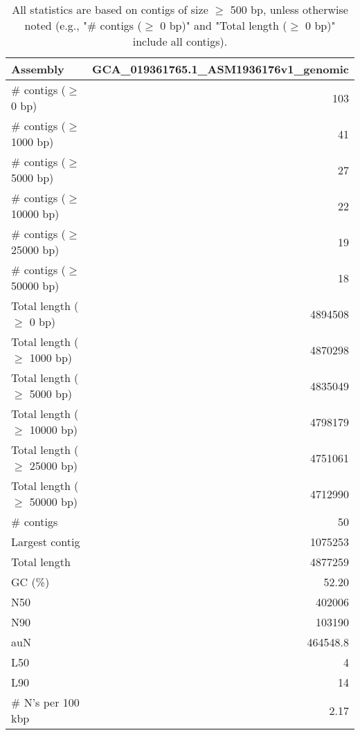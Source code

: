\documentclass[12pt,a4paper]{article}
\begin{document}
\begin{table}[ht]
\begin{center}
\caption{All statistics are based on contigs of size $\geq$ 500 bp, unless otherwise noted (e.g., "\# contigs ($\geq$ 0 bp)" and "Total length ($\geq$ 0 bp)" include all contigs).}
\begin{tabular}{|l*{1}{|r}|}
\hline
Assembly & GCA\_019361765.1\_ASM1936176v1\_genomic \\ \hline
\# contigs ($\geq$ 0 bp) & 103 \\ \hline
\# contigs ($\geq$ 1000 bp) & 41 \\ \hline
\# contigs ($\geq$ 5000 bp) & 27 \\ \hline
\# contigs ($\geq$ 10000 bp) & 22 \\ \hline
\# contigs ($\geq$ 25000 bp) & 19 \\ \hline
\# contigs ($\geq$ 50000 bp) & 18 \\ \hline
Total length ($\geq$ 0 bp) & 4894508 \\ \hline
Total length ($\geq$ 1000 bp) & 4870298 \\ \hline
Total length ($\geq$ 5000 bp) & 4835049 \\ \hline
Total length ($\geq$ 10000 bp) & 4798179 \\ \hline
Total length ($\geq$ 25000 bp) & 4751061 \\ \hline
Total length ($\geq$ 50000 bp) & 4712990 \\ \hline
\# contigs & 50 \\ \hline
Largest contig & 1075253 \\ \hline
Total length & 4877259 \\ \hline
GC (\%) & 52.20 \\ \hline
N50 & 402006 \\ \hline
N90 & 103190 \\ \hline
auN & 464548.8 \\ \hline
L50 & 4 \\ \hline
L90 & 14 \\ \hline
\# N's per 100 kbp & 2.17 \\ \hline
\end{tabular}
\end{center}
\end{table}
\end{document}
